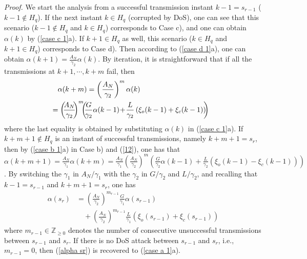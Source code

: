 \documentclass[letterpaper,journal,final,twocolumn]{IEEEtran}
\begin{document}
\emph{Proof.} 
We start the analysis from a successful transmission instant $k-1 = s_{r-1}$ ($k-1 \notin H_q$). If the next instant $k\in H_q$ (corrupted by DoS), one can see that this scenario ($k-1 \notin H_q$ and $k\in H_q$) corresponds to Case c), and one can obtain $\alpha(k)$ by (\ref{case c 1}a).
If $k+1 \in H_q$ as well, this scenario ($k\in H_q$ and $k+1 \in H_q$) corresponds to Case d). Then according to (\ref{case d 1}a), one can obtain $\alpha(k+1)=\frac{A_N}{\gamma_2}\alpha(k)$. 
By iteration, it is straightforward that if all the transmissions at $k+1, \cdots, k+m$ fail, then 
\begin{align}\label{12}\setlength{\arraycolsep}{1pt} 
&\alpha(k+m) 
= \left(\frac{A_N}{\gamma_2}\right)^m \alpha(k)\nonumber\\
&\!\!\!\!\!\!=\left(\!\!\frac{A_N}{\gamma_2}\!\!\right)^m \!\!\!  \left(\!\!  \frac{G}{\gamma_2}\alpha(k-1)       \!  +\! \frac{L}{\gamma_2}\left(\xi_o(k-1)+\xi_c(k-1)\right) \!\! \right)
\end{align}
where the last equality is obtained by substituting $\alpha(k)$ in (\ref{case c 1}a).
If $k+m+1 \notin H_q$ is an instant of successful transmissions, namely $k+m+1=s_r$, then by (\ref{case b 1}a) in Case b) and (\ref{12}), one has that 
$
\alpha(k+m+1) 
 =\frac{A_N}{\gamma_1} \alpha(k+m)=\frac{A_N}{\gamma_1}  \left(\frac{A_N}{\gamma_2}\right)^m \left(  \frac{G}{\gamma_2}\alpha(k-1)         +\frac{L}{\gamma_2}\left(\xi_o(k-1)-\xi_c(k-1)\right)  \right)
$. 
By switching the $\gamma_1$ in $A_N / \gamma_1$ with the $\gamma_2$ in $G /\gamma_2$ and $L/\gamma_2$, and recalling that $k-1 = s_{r-1}$ and $k+m+1=s_r$, 
one has
\begin{align}\label{alpha sr}  
\alpha(s_{r})
&= \left(\frac{A_N}{\gamma_2}\right)^{m_{r-1}}    \frac{G}{\gamma_1}\alpha(s_{r-1})      \nonumber\\   & \quad +\left(\! \frac{A_N}{\gamma_2}\!\!\right)^{m_{r-1}} \!\!\frac{L}{\gamma_1}\left(\xi_o(s_{r-1})+\xi_c(s_{r-1})\right)  
\end{align}  
where $ m_{r-1}\in \mathbb Z _{\ge 0} $ denotes the number of consecutive unsuccessful transmissions between $s_{r-1}$ and $s_r$.
If there is no DoS attack between $s_{r-1}$ and $s_r$, i.e., $m_{r-1}=0$, then (\ref{alpha sr}) is recovered to (\ref{case a 1}a).
\end{document}
